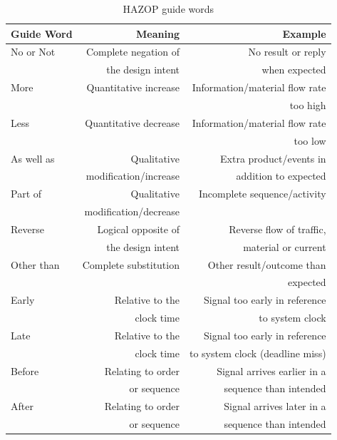 \begin{table}[h]
\centering
    \begin{tabular}{ | l | r | r |}
    \hline
    Guide Word & Meaning                                & Example \\ \hline \hline

    No or Not  & Complete negation of  & No result or reply\\ 
               & the design intent     & when expected \\ \hline
               
    More       & Quantitative increase & Information/material flow rate \\
               &                       & too high \\ \hline

    Less       & Quantitative decrease & Information/material flow rate \\
               &                       & too low  \\ \hline

    As well as & Qualitative           & Extra product/events in\\
               & modification/increase & addition to expected \\ \hline

    Part of    & Qualitative           & Incomplete sequence/activity\\
               & modification/decrease & \\ \hline

    Reverse    & Logical opposite of   &  Reverse flow of traffic,\\
               & the design intent     &  material or current\\ \hline
               
    Other than & Complete substitution &  Other result/outcome than \\ 
               &                       &  expected \\ \hline
    Early      & Relative to the       &  Signal too early in reference\\
               & clock time            &  to system clock\\ \hline

    Late       & Relative to the       &  Signal too early in reference \\
               & clock time            &  to system clock (deadline miss)\\ \hline
               
    Before     & Relating to order     &  Signal arrives earlier in a \\
               & or sequence           &  sequence than intended\\ \hline
               
    After      & Relating to order     &  Signal arrives later in a\\
               & or sequence           &  sequence than intended\\ \hline
    \end{tabular}
\caption{HAZOP guide words}
\label{table:hazop_guide_words}
\end{table}
